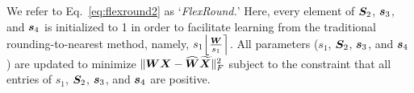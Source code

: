 \documentclass{article}
\theoremstyle{plain}
\theoremstyle{definition}
\theoremstyle{remark}
\begin{document}
We refer to Eq.~\ref{eq:flexround2} as `\emph{FlexRound.}' Here, every element of ${\bm{S}}_2$, ${\bm{s}}_3$, and ${\bm{s}}_4$ is initialized to 1 in order to facilitate learning from the traditional rounding-to-nearest method, namely, $s_1 \Big\lfloor {{\bm{W}}\over s_1} \Big\rceil$. All parameters ($s_1$, ${\bm{S}}_2$, ${\bm{s}}_3$, and ${\bm{s}}_4$) are updated to minimize $\|{\bm{W}}{\bm{X}} - \widehat{{\bm{W}}}\widetilde{{\bm{X}}}\|^2_F$ subject to the constraint that all entries of $s_1$, ${\bm{S}}_2$, ${\bm{s}}_3$, and ${\bm{s}}_4$ are positive.





\end{document}
